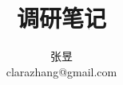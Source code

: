 \documentclass[a4paper]{article}
\begin{document}
\title{调研笔记}
\author{张昱\\clarazhang@gmail.com}

\maketitle
\tableofcontents
\setcounter{tocdepth}{3}
\newpage










\begin{small}


\end{small}
\end{document}
